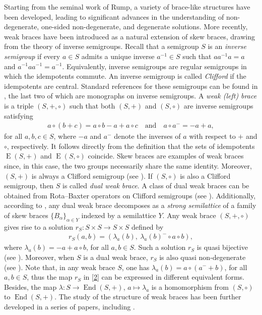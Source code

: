 \documentclass[preprint,1p]{elsarticle}
\theoremstyle{definition}               %
\DeclareMathOperator{\End}{End}
\DeclareMathOperator{\E}{E}
\begin{document}
Starting from the seminal work of Rump, a variety of brace-like structures have been developed, leading to significant advances in the understanding of non-degenerate, one-sided non-degenerate, and degenerate solutions. More recently, weak braces \cite{CaMaMiSt22} have been introduced as a natural extension of skew braces, drawing from the theory of inverse semigroups. Recall that a semigroup $S$ is an \emph{inverse semigroup} if every $a \in S$ admits a unique inverse $a^{-1}\in S$ such that $aa^{-1}a=a$ and $a^{-1}aa^{-1}=a^{-1}$.
Equivalently, inverse semigroups are regular semigroups in which the idempotents commute. An inverse semigroup is called \emph{Clifford} if the idempotents are central. Standard references for these semigroups can be found in \cite{Ho95, La98, Law26}, the last two of which are monographs on inverse semigroups. A \emph{weak (left) brace} is a triple $\left(S,+,\circ\right)$ such that both $\left(S,+\right)$ and $\left(S,\circ\right)$ are inverse semigroups satisfying 
\begin{align*}
    a \circ (b+c)=a \circ b-a+a\circ c \quad \text{and} \quad a \circ a^-=-a+a,
\end{align*}
for all $a, b, c \in S$, where $-a$ and $a^-$ denote the inverses of $a$ with respect to $+$ and $\circ$, respectively. It follows directly from the definition that the sets of idempotents $\E(S,+)$ and $\E(S, \circ)$ coincide. Skew braces are examples of weak braces since, in this case, the two groups necessarily share the same identity.
Moreover, $(S,+)$ is always a Clifford semigroup (see \cite[Theorem 8]{CaMaMiSt22}). If $(S, \circ)$ is also a Clifford semigroup, then $S$ is called \emph{dual weak brace}. A class of dual weak braces can be obtained from Rota--Baxter operators on Clifford semigroups (see \cite{CaMaSt23}). Additionally, according to \cite[Theorem 2.1]{CaMaSt24}, any dual weak brace decomposes as a \emph{strong semilattice} of a family of skew braces $\{B_\alpha\}_{\alpha\in Y}$ indexed by a semilattice $Y$. Any weak brace $(S, +, \circ)$ gives rise to a solution $r_S:S\times S\to S\times S$ defined by
\begin{align}\label{2}
    r_S\left(a,b\right)
    = \left(\lambda_a(b), \ \lambda_a(b)^-\circ a\circ b\right),
\end{align}
where $\lambda_a(b)=-a+a\circ b$, for all $a,b\in S$. Such a solution $r_S$ is quasi bijective (see \cite[Theorem 11]{CaMaMiSt22}). Moreover, when $S$ is a dual weak brace, $r_S$ is also quasi non-degenerate (see \cite[Theorem 13]{CaMaMiSt22}). Note that, in any weak brace $S$, one has $\lambda_a(b)=a \circ \left(a^-+b\right)$, for all $a, b \in S$, thus the map $r_S$ in \eqref{2} can be expressed in different equivalent forms. Besides, the map $\lambda: S \to \End(S, +)$, $a \mapsto \lambda_a$ is a homomorphism from $(S, \circ)$ to $\End(S, +)$. The study of the structure of weak braces has been further developed in a series of papers, including \cite{CaMaSt23, GoWa26,  LiWa25, MaRySt25, MaSteWi26x, Wang25x}.
\end{document}
